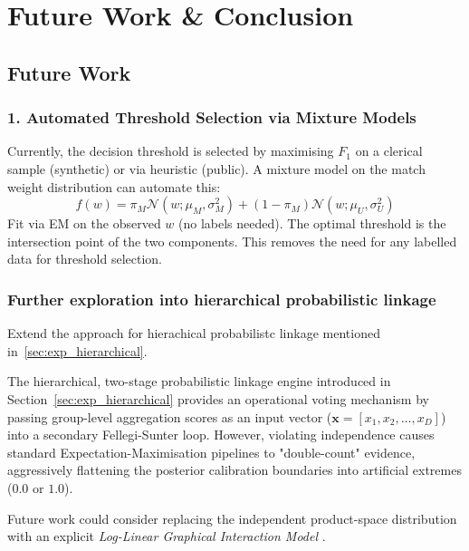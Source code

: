 \section{Future Work \& Conclusion}
\label{sec:conclusion}

\subsection{Future Work}
\label{sec:future_work}

\subsubsection{1. Automated Threshold Selection via Mixture Models}
\label{sec:future_mixture}
Currently, the decision threshold is selected by maximising $F_1$ on a clerical sample (synthetic) or via heuristic (public).
A mixture model on the match weight distribution can automate this:
\begin{equation}
	f(w) = \pi_M \mathcal{N}(w; \mu_M, \sigma_M^2) + (1-\pi_M) \mathcal{N}(w; \mu_U, \sigma_U^2)
\end{equation}
Fit via EM on the observed $w$ (no labels needed). The optimal threshold is the intersection point of the two components.
This removes the need for any labelled data for threshold selection.

\subsubsection{Further exploration into hierarchical probabilistic linkage}
\label{sec:future_hierarchical_splink}
Extend the approach for hierachical probabilistc linkage mentioned in~\ref{sec:exp_hierarchical}.

The hierarchical, two-stage probabilistic linkage engine introduced in Section~\ref{sec:exp_hierarchical} provides an operational voting mechanism by passing group-level aggregation scores as an input vector ($\mathbf{x} = [x_1, x_2, \dots, x_D]$) into a secondary Fellegi-Sunter loop. However, violating independence causes standard Expectation-Maximisation pipelines to "double-count" evidence, aggressively flattening the posterior calibration boundaries into artificial extremes ($0.0$ or $1.0$).

Future work could consider replacing the independent product-space distribution with an explicit \textit{Log-Linear Graphical Interaction Model} \citep{thibaudeau1993discrimination, winkler1993improved}. 

